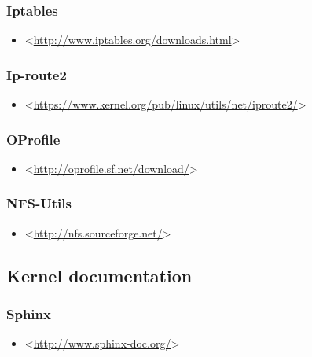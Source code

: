 \documentclass[a4paper,8pt,english]{sphinxmanual}
\begin{document}
\subsubsection{Iptables}
\label{process/changes:iptables}\begin{itemize}
\item {} 
\textless{}\href{http://www.iptables.org/downloads.html}{http://www.iptables.org/downloads.html}\textgreater{}

\end{itemize}


\subsubsection{Ip-route2}
\label{process/changes:ip-route2}\begin{itemize}
\item {} 
\textless{}\href{https://www.kernel.org/pub/linux/utils/net/iproute2/}{https://www.kernel.org/pub/linux/utils/net/iproute2/}\textgreater{}

\end{itemize}


\subsubsection{OProfile}
\label{process/changes:oprofile}\begin{itemize}
\item {} 
\textless{}\href{http://oprofile.sf.net/download/}{http://oprofile.sf.net/download/}\textgreater{}

\end{itemize}


\subsubsection{NFS-Utils}
\label{process/changes:id27}\begin{itemize}
\item {} 
\textless{}\href{http://nfs.sourceforge.net/}{http://nfs.sourceforge.net/}\textgreater{}

\end{itemize}


\subsection{Kernel documentation}
\label{process/changes:id28}

\subsubsection{Sphinx}
\label{process/changes:id29}\begin{itemize}
\item {} 
\textless{}\href{http://www.sphinx-doc.org/}{http://www.sphinx-doc.org/}\textgreater{}

\end{itemize}
\end{document}
